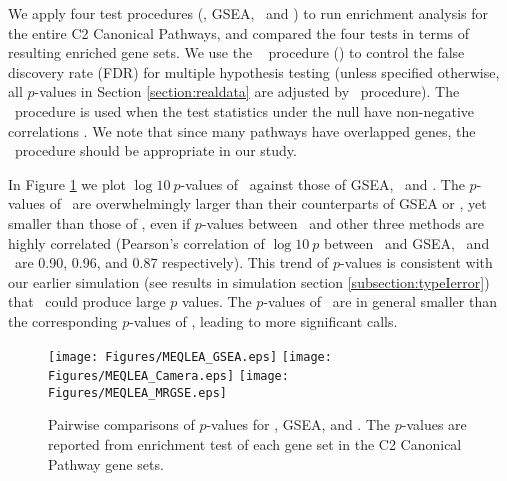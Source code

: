 	We apply four test procedures (\OurMethod, GSEA, \CMT~and \genr) to run enrichment analysis 
	for	the entire C2 Canonical Pathways, and compared the four tests in terms of resulting
	enriched gene sets. %
	We use the \FDR~\citep{benjamini1995controlling} procedure (\FDRabb) to control the false
	discovery rate (FDR) for multiple hypothesis testing (unless specified otherwise, all 
	$p$-values in Section \ref{section:realdata} are adjusted by \FDRabb~procedure). The 
	\FDRabb~procedure is used when the test statistics under the null have non-negative 
	correlations \citep{benjamini2001control}. We note that since many pathways have overlapped 
	genes, the \FDRabb~procedure should be appropriate in our study.
	
	In Figure \ref{fig:HDdatap} we plot $\log 10~p$-values of \OurMethod~against those of GSEA, 
	\CMT~and \genr.
	The $p$-values of \CMT~are overwhelmingly larger than their counterparts of GSEA or \OurMethod, 
	yet smaller than those of \genr, even 
	if $p$-values between \OurMethod~and other three methods are highly correlated (Pearson's 
	correlation of $\log 10 ~p$ between \OurMethod~and GSEA, \CMT~and \genr~are 0.90, 0.96, and 
	0.87 respectively). This trend of $p$-values is consistent with our earlier simulation (see 
	results in simulation section \ref{subsection:typeIerror}) that
	\CMT~could produce large $p$ values. The $p$-values of \genr~are in general smaller than the 
	corresponding $p$-values of \OurMethod, leading to more significant calls. 
	
	\begin{figure}[h!]
		\begin{center}
			\texttt{[image: Figures/MEQLEA\_GSEA.eps]}
			\texttt{[image: Figures/MEQLEA\_Camera.eps]}
			\texttt{[image: Figures/MEQLEA\_MRGSE.eps]}
		\end{center} 
		\caption[Pairwise comparisons of $p$-values for different methods]{Pairwise comparisons of 
		$p$-values for \OurMethod, GSEA, \CMT and \genr. The $p$-values 
		are
			reported from enrichment test of each gene set in the C2 Canonical Pathway gene sets.
		}\label{fig:HDdatap}
	\end{figure} 
	
